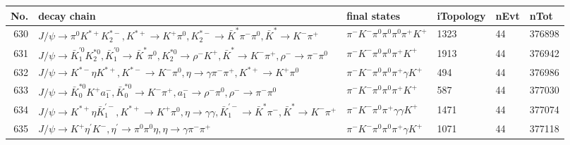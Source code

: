 \begin{table}[htbp] 
\begin{center}
\begin{small}
\begin{tabular}{rlllll}\hline\hline
 No. & decay chain & final states &  iTopology & nEvt & nTot \\\hline
630&$J/\psi       \rightarrow \pi^{0}        K^{*+}         K_2^{*-}       , K^{*+}          \rightarrow K^{+}          \pi^{0}        , K_2^{*-}        \rightarrow \bar{K}^{*}   \pi^{-}        \pi^{0}        , \bar{K}^{*}    \rightarrow K^{-}          \pi^{+}        $&$\pi^{-}        K^{-}          \pi^{0}        \pi^{0}        \pi^{0}        \pi^{+}        K^{+}          $& 1323&   44&376898\\
631&$J/\psi       \rightarrow \bar{K}_1^{'0}K_2^{*0}       , \bar{K}_1^{'0} \rightarrow \bar{K}^{*}   \pi^{0}        , K_2^{*0}        \rightarrow \rho^{-}      K^{+}          , \bar{K}^{*}    \rightarrow K^{-}          \pi^{+}        , \rho^{-}       \rightarrow \pi^{-}        \pi^{0}        $&$\pi^{-}        K^{-}          \pi^{0}        \pi^{0}        \pi^{+}        K^{+}          $& 1913&   44&376942\\
632&$J/\psi       \rightarrow K^{*-}         \eta          K^{*+}         , K^{*-}          \rightarrow K^{-}          \pi^{0}        , \eta           \rightarrow \gamma       \pi^{-}        \pi^{+}        , K^{*+}          \rightarrow K^{+}          \pi^{0}        $&$\pi^{-}        K^{-}          \pi^{0}        \pi^{0}        \pi^{+}        \gamma       K^{+}          $&  494&   44&376986\\
633&$J/\psi       \rightarrow \bar{K}_0^{*0}K^{+}          a_{1}^{-}      , \bar{K}_0^{*0} \rightarrow K^{-}          \pi^{+}        , a_{1}^{-}       \rightarrow \rho^{-}      \pi^{0}        , \rho^{-}       \rightarrow \pi^{-}        \pi^{0}        $&$\pi^{-}        K^{-}          \pi^{0}        \pi^{0}        \pi^{+}        K^{+}          $&  587&   44&377030\\
634&$J/\psi       \rightarrow K^{*+}         \eta          \bar{K}_1^{'-}, K^{*+}          \rightarrow K^{+}          \pi^{0}        , \eta           \rightarrow \gamma       \gamma       , \bar{K}_1^{'-} \rightarrow \bar{K}^{*}   \pi^{-}        , \bar{K}^{*}    \rightarrow K^{-}          \pi^{+}        $&$\pi^{-}        K^{-}          \pi^{0}        \pi^{+}        \gamma       \gamma       K^{+}          $& 1471&   44&377074\\
635&$J/\psi       \rightarrow K^{+}          \eta^{\prime} K^{-}          , \eta^{\prime}  \rightarrow \pi^{0}        \pi^{0}        \eta          , \eta           \rightarrow \gamma       \pi^{-}        \pi^{+}        $&$\pi^{-}        K^{-}          \pi^{0}        \pi^{0}        \pi^{+}        \gamma       K^{+}          $& 1071&   44&377118\\

\end{tabular}
\end{small}
\end{center}
\end{table}
